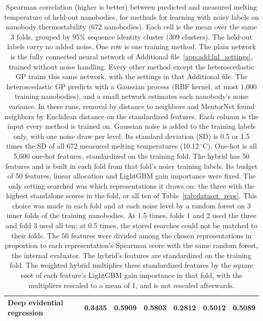 \begin{table}[htbp]
\begin{tabular}{@{}lcccccc@{}}
Deep evidential regression & 0.3435 & 0.5909 & 0.5803 & 0.2812 & 0.5012 & 0.5089 \\
\bottomrule
\end{tabular}
\caption[Methods for learning with noisy labels on nanobody thermostability]{Spearman correlation (higher is better) between predicted and measured melting temperature of held-out nanobodies, for methods for learning with noisy labels on nanobody thermostability (672 nanobodies). Each cell is the mean over the same 3 folds, grouped by 95\% sequence identity cluster (309 clusters). The held-out labels carry no added noise. One row is one training method. The plain network is the fully connected neural network of Additional file~\ref{app:add:lnl_settings}, trained without noise handling. Every other method except the heteroscedastic GP trains this same network, with the settings in that Additional file. The heteroscedastic GP predicts with a Gaussian process (RBF kernel, at most 1,000 training nanobodies), and a small network estimates each nanobody's noise variance. In these runs, removal by distance to neighbors and MentorNet found neighbors by Euclidean distance on the standardized features. Each column is the input every method is trained on. Gaussian noise is added to the training labels only, with one noise draw per level. Its standard deviation (SD) is 0.5 or 1.5 times the SD of all 672 measured melting temperatures (10.12\,$^\circ$C). One-hot is all 5,600 one-hot features, standardized on the training fold. The hybrid has 50 features and is built in each fold from that fold's noisy training labels. Its budget of 50 features, linear allocation and LightGBM gain importance were fixed. The only setting searched was which representations it draws on: the three with the highest standalone scores in the fold, or all ten of Table~\ref{tab:dataset_reps}. This choice was made in each fold and at each noise level by a random forest on 3 inner folds of the training nanobodies. At 1.5 times, folds 1 and 2 used the three and fold 3 used all ten; at 0.5 times, the stored searches could not be matched to their folds. The 50 features were divided among the chosen representations in proportion to each representation's Spearman score with the same random forest, the internal evaluator. The hybrid's features are standardized on the training fold. The weighted hybrid multiplies these standardized features by the square root of each feature's LightGBM gain importance in that fold, with the multipliers rescaled to a mean of 1, and is not rescaled afterwards.}
\label{tab:ch6prelim_lnl}
\end{table}


